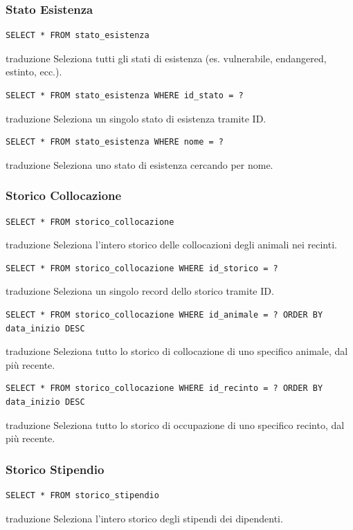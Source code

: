 \documentclass[12pt,a4paper]{report}
\begin{document}
\subsubsection*{Stato Esistenza}
\begin{lstlisting}[style=sqlstyle]
SELECT * FROM stato_esistenza
\end{lstlisting}
traduzione {Seleziona tutti gli stati di esistenza (es. vulnerabile, endangered, estinto, ecc.).}

\begin{lstlisting}[style=sqlstyle]
SELECT * FROM stato_esistenza WHERE id_stato = ?
\end{lstlisting}
traduzione {Seleziona un singolo stato di esistenza tramite ID.}

\begin{lstlisting}[style=sqlstyle]
SELECT * FROM stato_esistenza WHERE nome = ?
\end{lstlisting}
traduzione {Seleziona uno stato di esistenza cercando per nome.}

\subsubsection*{Storico Collocazione}
\begin{lstlisting}[style=sqlstyle]
SELECT * FROM storico_collocazione
\end{lstlisting}
traduzione {Seleziona l'intero storico delle collocazioni degli animali nei recinti.}

\begin{lstlisting}[style=sqlstyle]
SELECT * FROM storico_collocazione WHERE id_storico = ?
\end{lstlisting}
traduzione {Seleziona un singolo record dello storico tramite ID.}

\begin{lstlisting}[style=sqlstyle]
SELECT * FROM storico_collocazione WHERE id_animale = ? ORDER BY data_inizio DESC
\end{lstlisting}
traduzione {Seleziona tutto lo storico di collocazione di uno specifico animale, dal più recente.}

\begin{lstlisting}[style=sqlstyle]
SELECT * FROM storico_collocazione WHERE id_recinto = ? ORDER BY data_inizio DESC
\end{lstlisting}
traduzione {Seleziona tutto lo storico di occupazione di uno specifico recinto, dal più recente.}

\subsubsection*{Storico Stipendio}
\begin{lstlisting}[style=sqlstyle]
SELECT * FROM storico_stipendio
\end{lstlisting}
traduzione {Seleziona l'intero storico degli stipendi dei dipendenti.}
\end{document}
